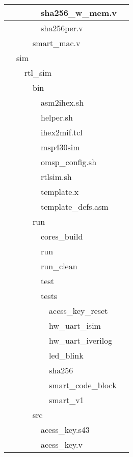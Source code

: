 \begin{longtable}{|p{0.15cm}|p{0.15cm}|p{0.15cm}|p{0.15cm}|p{0.15cm}|p{0.15cm}|p{8.6cm}|}
	\hline
	& & & & \multicolumn{2}{l|}{sha256\_w\_mem.v} & \\
	\hline
	& & & & \multicolumn{2}{l|}{sha256per.v} & \\
	\hline
	& & & \multicolumn{3}{l|}{smart\_mac.v} & \\
	\hline
	& \multicolumn{5}{l|}{sim} & \\
	\hline
	& & \multicolumn{4}{l|}{rtl\_sim} & \\
	\hline
	& & & \multicolumn{3}{l|}{bin} & \\
	\hline
	& & & & \multicolumn{2}{l|}{asm2ihex.sh} & \\
	\hline
	& & & & \multicolumn{2}{l|}{helper.sh} & \\
	\hline
	& & & & \multicolumn{2}{l|}{ihex2mif.tcl} & \\
	\hline
	& & & & \multicolumn{2}{l|}{msp430sim} & \\
	\hline
	& & & & \multicolumn{2}{l|}{omsp\_config.sh} & \\
	\hline
	& & & & \multicolumn{2}{l|}{rtlsim.sh} & \\
	\hline
	& & & & \multicolumn{2}{l|}{template.x} & \\
	\hline
	& & & & \multicolumn{2}{l|}{template\_defs.asm} & \\
	\hline
	& & & \multicolumn{3}{l|}{run} & \\
	\hline
	& & & & \multicolumn{2}{l|}{cores\_build} & \\
	\hline
	& & & & \multicolumn{2}{l|}{run} & \\
	\hline
	& & & & \multicolumn{2}{l|}{run\_clean} & \\
	\hline
	& & & & \multicolumn{2}{l|}{test} & \\
	\hline
	& & & & \multicolumn{2}{l|}{tests} & \\
	\hline
	& & & & & acess\_key\_reset & \\
	\hline
	& & & & & hw\_uart\_isim & \\
	\hline
	& & & & & hw\_uart\_iverilog & \\
	\hline
	& & & & & led\_blink & \\
	\hline
	& & & & & sha256 & \\
	\hline
	& & & & & smart\_code\_block & \\
	\hline
	& & & & & smart\_v1 & \\
	\hline
	& & & \multicolumn{3}{l|}{src} & \\
	\hline
	& & & & \multicolumn{2}{l|}{acess\_key.s43} & \\
	\hline
	& & & & \multicolumn{2}{l|}{acess\_key.v} & \\

\end{longtable}
